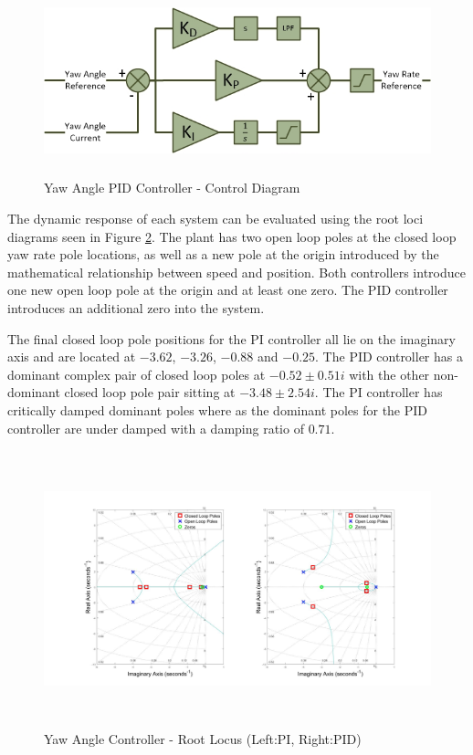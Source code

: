 	\begin{figure}[H]
		\centering
		\includegraphics[height = 5.5cm]{../References/Diagrams/YawAngleControllerPID.jpg}
		\caption{Yaw Angle PID Controller -  Control Diagram}
		\label{IM_YawAngleControllerPID}
	\end{figure}

	The dynamic response of each system can be evaluated using the root loci diagrams seen in Figure \ref{IM_YawAngleControlRoot}. The plant has two open loop poles at the closed loop yaw rate pole locations, as well as a new pole at the origin introduced by the mathematical relationship between speed and position. Both controllers introduce one new open loop pole at the origin and at least one zero. The PID controller introduces an additional zero into the system.  
	
	The final closed loop pole positions for the PI controller all lie on the imaginary axis and are located at $-3.62$, $-3.26$, $-0.88$ and $-0.25$. The PID controller has a dominant complex pair of closed loop poles at $-0.52 \pm 0.51 i$ with the other non-dominant closed loop pole pair sitting at $-3.48 \pm 2.54 i$. The PI controller has critically damped dominant poles where as the dominant poles for the PID controller are under damped with a damping ratio of $0.71$.
	
	\begin{figure}[H]
		\centering
		\includegraphics[height = 8cm]{../Design/Matlab/Controllers/yaw_angle_root.jpg}
		\caption{Yaw Angle Controller -  Root Locus (Left:PI, Right:PID)}
		\label{IM_YawAngleControlRoot}
	\end{figure}
	
